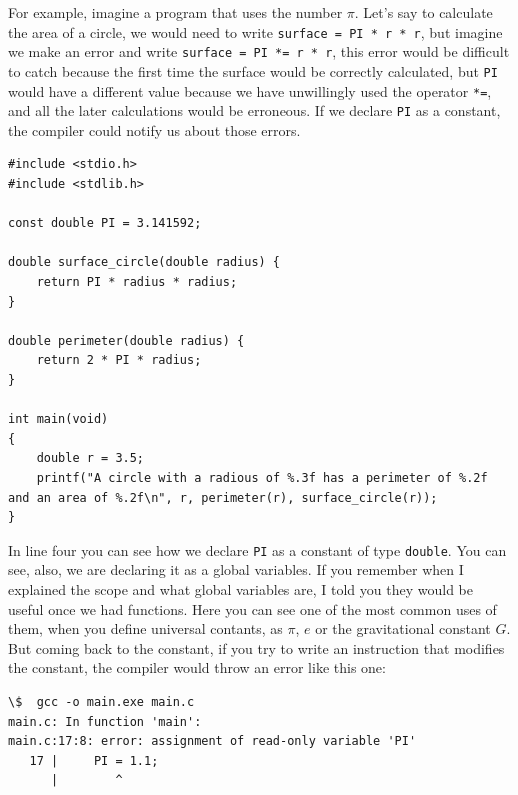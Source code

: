 \documentclass[a4paper]{article}
\begin{document}
For example, imagine a program that uses the number $\pi$. Let's say to
calculate the area of a circle, we would need to write
\verb!surface = PI * r * r!, but imagine we make an error and write
\verb!surface = PI *= r * r!, this error would be difficult to catch because
the first time the surface would be correctly calculated, but \verb!PI! would
have a different value because we have unwillingly used the operator \verb!*=!,
and all the later calculations would be erroneous. If we declare \verb!PI! as
a constant, the compiler could notify us about those errors.

\noindent
\begin{minipage}[H]{\linewidth}
\mbox{}
\begin{lstlisting}[style=C,
caption={Uso de una constante numérica},
label={lst:constantUsage}]
#include <stdio.h>
#include <stdlib.h>

const double PI = 3.141592;

double surface_circle(double radius) {
    return PI * radius * radius;
}

double perimeter(double radius) {
    return 2 * PI * radius;
}

int main(void)
{
    double r = 3.5;
    printf("A circle with a radious of %.3f has a perimeter of %.2f and an area of %.2f\n", r, perimeter(r), surface_circle(r));
}
\end{lstlisting}
\end{minipage}

In line four you can see how we declare \verb!PI! as a constant of type
\verb!double!. You can see, also, we are declaring it as a global variables. If
you remember when I explained the scope and what global variables are, I told
you they would be useful once we had functions. Here you can see one of the most
common uses of them, when you define universal contants, as $\pi$, $e$ or the
gravitational constant $G$. But coming back to the constant, if you try to write
an instruction that modifies the constant, the compiler would throw an error
like this one:

\noindent
\begin{minipage}[H]{\linewidth}
\mbox{}
\begin{lstlisting}[style=terminalStyle]
\$  gcc -o main.exe main.c
main.c: In function 'main':
main.c:17:8: error: assignment of read-only variable 'PI'
   17 |     PI = 1.1;
      |        ^
\end{lstlisting}
\end{minipage}
\end{document}
